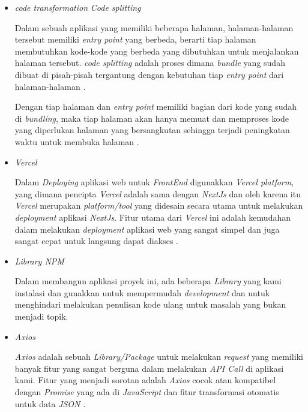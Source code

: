 \documentclass[a4paper]{article}
\begin{document}
\begin{enumerate}[label=\alph*. ]
\begin{enumerate}
\begin{itemize}
                        \item \textit{code transformation} \textit{Code splitting}

                        Dalam sebuah aplikasi yang memiliki beberapa halaman, halaman-halaman tersebut memiliki \textit{entry point} yang berbeda, berarti tiap halaman membutuhkan kode-kode yang berbeda yang dibutuhkan untuk menjalankan halaman tersebut. \textit{code splitting} adalah proses dimana \textit{bundle} yang sudah dibuat di pisah-pisah tergantung dengan kebutuhan tiap \textit{entry point} dari halaman-halaman \autocite{Nextjs_code_splitting}.

                        Dengan tiap halaman dan \textit{entry point} memiliki bagian dari kode yang sudah di \textit{bundling}, maka tiap halaman akan hanya memuat dan memproses kode yang diperlukan halaman yang bersangkutan sehingga terjadi peningkatan waktu untuk membuka halaman \autocite{Nextjs_code_splitting}.

                        \item \textit{Vercel}

                        Dalam \textit{Deploying} aplikasi web untuk \textit{FrontEnd} digunakkan \textit{Vercel platform}, yang dimana pencipta \textit{Vercel} adalah sama dengan \textit{NextJs} dan oleh karena itu \textit{Vercel} merupakan \textit{platform/tool} yang didesain secara utama untuk melakukan \textit{deployment} aplikasi \textit{NextJs}. Fitur utama dari \textit{Vercel} ini adalah kemudahan dalam melakukan \textit{deployment} aplikasi web yang sangat simpel dan juga sangat cepat untuk langsung dapat diakses \autocite{Nextjs_vercel}.

                        \item \textit{Library NPM}

                        Dalam membangun aplikasi proyek ini, ada beberapa \textit{Library} yang kami instalasi dan gunakkan untuk mempermudah \textit{development} dan untuk menghindari melakukan penulisan kode ulang untuk masalah yang bukan menjadi topik.

                        \item \textit{Axios}

                        \textit{Axios} adalah sebuah \textit{Library/Package} untuk melakukan \textit{request} yang memiliki banyak fitur yang sangat berguna dalam melakukan \textit{API Call} di aplikasi kami. Fitur yang menjadi sorotan adalah \textit{Axios} cocok atau kompatibel dengan \textit{Promise} yang ada di \textit{JavaScript} dan fitur transformasi otomatis untuk data \textit{JSON} \autocite{axios_github_general}.


\end{itemize}
\end{enumerate}
\end{enumerate}
\end{document}
